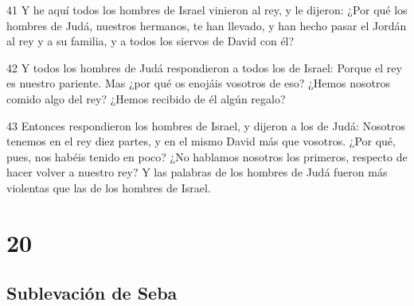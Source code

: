 \par 41 Y he aquí todos los hombres de Israel vinieron al rey, y le dijeron: ¿Por qué los hombres de Judá, nuestros hermanos, te han llevado, y han hecho pasar el Jordán al rey y a su familia, y a todos los siervos de David con él?
\par 42 Y todos los hombres de Judá respondieron a todos los de Israel: Porque el rey es nuestro pariente. Mas ¿por qué os enojáis vosotros de eso? ¿Hemos nosotros comido algo del rey? ¿Hemos recibido de él algún regalo?
\par 43 Entonces respondieron los hombres de Israel, y dijeron a los de Judá: Nosotros tenemos en el rey diez partes, y en el mismo David más que vosotros. ¿Por qué, pues, nos habéis tenido en poco? ¿No hablamos nosotros los primeros, respecto de hacer volver a nuestro rey? Y las palabras de los hombres de Judá fueron más violentas que las de los hombres de Israel.

\chapter{20}

\section*{Sublevación de Seba}

